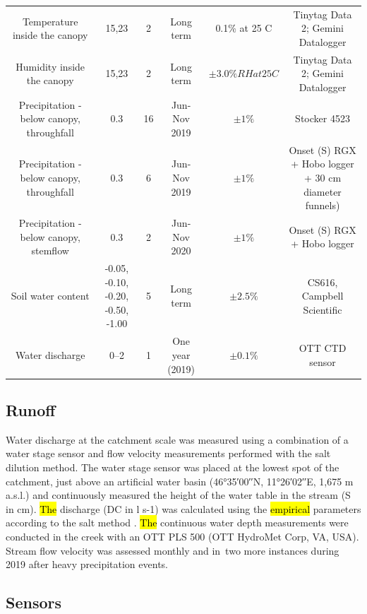 \documentclass[10pt,letterpaper]{article}
\begin{document}
\begin{landscape}
\begin{table}[!h]
\begin{tabular*}{\linewidth}{@{\extracolsep{\fill}} cccccc }
	Temperature inside the canopy & 15,23 & 2 & Long term & 0.1\% at 25 C & Tinytag Data 2; Gemini Datalogger \\
	Humidity inside the canopy & 15,23 & 2 & Long term & $\pm3.0\% RH at 25 C$ & Tinytag Data 2; Gemini Datalogger \\
	Precipitation - below canopy, throughfall & 0.3 & 16 & Jun-Nov 2019 & $\pm1\%$ & Stocker 4523 \\
	Precipitation - below canopy, throughfall & 0.3 & 6 & Jun-Nov 2019 & $\pm1\%$ &  \makecell[l]{Onset (S) RGX + Hobo logger \\ + 30 cm diameter funnels)} \\
	Precipitation - below canopy, stemflow & 0.3 & 2 & Jun-Nov 2020 & $\pm1\%$ & Onset (S) RGX + Hobo logger \\
	Soil water content & \makecell[l]{-0.05, -0.10, -0.20, \\ -0.50, -1.00} & 5 & Long term & $\pm2.5\%$ & CS616, Campbell Scientific \\
	Water discharge & 0--2 & 1 & One year (2019) & $\pm0.1\%$ & OTT CTD sensor \\
\bottomrule
\end{tabular*}
\end{table} 
\end{landscape}

\subsection{Runoff}

Water discharge at the catchment scale was measured using a combination of a water stage sensor and flow velocity measurements performed with the salt dilution method. The water stage sensor was placed at the lowest spot of the catchment, just above an artificial water basin (46°35′00′′N, 11°26′02′′E, 1,675 m a.s.l.) and continuously measured the height of the water table in the stream (S in cm). \hl{The }discharge (DC in l s-1) was calculated using the\hl{ empirical} parameters according to the salt method \cite{DAY1977125}. \hl{The} continuous water depth measurements were conducted in the creek with an OTT PLS 500 (OTT HydroMet Corp, VA, USA). Stream flow velocity was assessed monthly and in two more instances during 2019 after heavy precipitation events. 

\subsection{Sensors}
\end{document}
